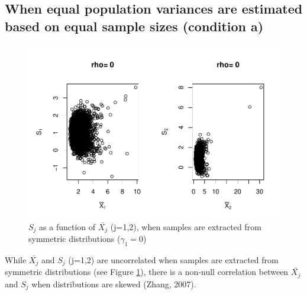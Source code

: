 \documentclass[
  man]{apa6}
\begin{document}
\hypertarget{when-equal-population-variances-are-estimated-based-on-equal-sample-sizes-condition-a}{%
\subsection{When equal population variances are estimated based on equal sample sizes (condition a)}\label{when-equal-population-variances-are-estimated-based-on-equal-sample-sizes-condition-a}}

\begin{figure}
\centering
\includegraphics{Correlations-between-the-sample-means-difference-and-standardizers-of-all-estimators,-and-implications-on-biases-and-variances-of-all-estimators_files/figure-latex/pltSDMEANHombalsym-1.pdf}
\caption{\label{fig:pltSDMEANHombalsym}\(S_j\) as a function of \(\bar{X_j}\) (j=1,2), when samples are extracted from symmetric distributions (\(\gamma_1 = 0\))}
\end{figure}

While \(\bar{X_j}\) and \(S_j\) (j=1,2) are uncorrelated when samples are extracted from symmetric distributions (see Figure \ref{fig:pltSDMEANHombalsym}), there is a non-null correlation between \(\bar{X_j}\) and \(S_j\) when distributions are skewed (Zhang, 2007).
\end{document}
